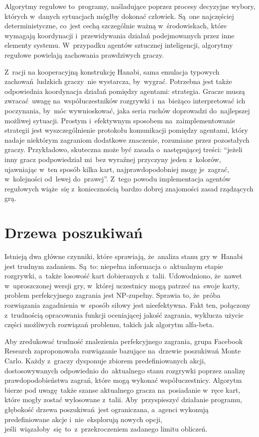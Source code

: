 \documentclass[declaration,shortabstract,inz]{iithesis}
\begin{document}
Algorytmy regułowe to~programy, naśladujące poprzez procesy decyzyjne wybory, których w~danych sytuacjach mógłby dokonać człowiek. Są~one najczęściej deterministyczne, co~jest cechą szczególnie ważną w~środowiskach, które wymagają koordynacji i~przewidywania działań podejmowanych przez inne elementy systemu. W~przypadku agentów sztucznej inteligencji, algorytmy regułowe powielają zachowania prawdziwych graczy.

Z~racji na kooperacyjną konstrukcję Hanabi, sama emulacja typowych zachowań ludzkich graczy~nie wystarcza, by~wygrać. Potrzebna jest także odpowiednia koordynacja działań pomiędzy agentami: strategia. Gracze muszą zwracać uwagę na~współuczestników rozgrywki i~na~bieżąco interpretować ich poczynania, by~móc wywnioskować, jaka seria ruchów doprowadzi do~najlepszej możliwej sytuacji. Prostym i~efektywnym sposobem na~zaimplementowanie strategii jest wyszczególnienie protokołu komunikacji pomiędzy agentami, który nadaje niektórym zagraniom dodatkowe znaczenie, rozumiane przez pozostałych graczy. Przykładowo, skuteczna może być zasada o~następującej treści: ``jeżeli inny gracz podpowiedział mi~bez wyraźnej przyczyny jeden z~kolorów, ujawniając w~ten sposób kilka kart, najprawdopodobniej mogę je~zagrać, w~kolejności od~lewej do~prawej''. Z~tego powodu implementacja agentów regułowych wiąże~się z~koniecznością bardzo dobrej znajomości zasad rządzących grą.

\section{Drzewa poszukiwań}
\label{sec:fb}

Istnieją dwa główne czynniki, które sprawiają, że~analiza stanu gry w~Hanabi jest trudnym zadaniem. Są~to: niepełna informacja o~aktualnym etapie rozgrywki, a~także losowość kart dobieranych z~talii. Udowodniono, że~nawet w~uproszczonej wersji gry, w~której uczestnicy mogą patrzeć na~swoje karty, problem perfekcyjnego zagrania jest NP-zupełny\cite{NP-Complete}. Sprawia to, że~próba rozwiązania zagadnienia w~sposób siłowy jest nieefektywna. Fakt ten, połączony z~trudnością opracowania funkcji oceniającej jakość zagrania, wyklucza użycie części możliwych rozwiązań problemu, takich jak algorytm alfa-beta.

Aby zredukować trudność znalezienia perfekcyjnego zagrania, grupa Facebook Research zaproponowała rozwiązanie bazujące na~drzewie poszukiwań Monte Carlo\cite{MCTS}. Każdy z~graczy dysponuje zbiorem predefiniowanych akcji, dostosowywanych odpowiednio do~aktualnego stanu rozgrywki poprzez analizę prawdopodobieństwa zagrań, które mogą wykonać współuczestnicy. Algorytm bierze pod uwagę także szanse aktualnego gracza na~posiadanie w~ręce kart, które mogły zostać wylosowane z~talii. Aby~przyspieszyć działanie programu, głębokość drzewa poszukiwań jest ograniczana, a~agenci wykonują predefiniowane akcje i~nie~eksplorują nowych opcji, jeśli~wiązałoby~się to~z~przekroczeniem zadanego limitu obliczeń.
\end{document}
